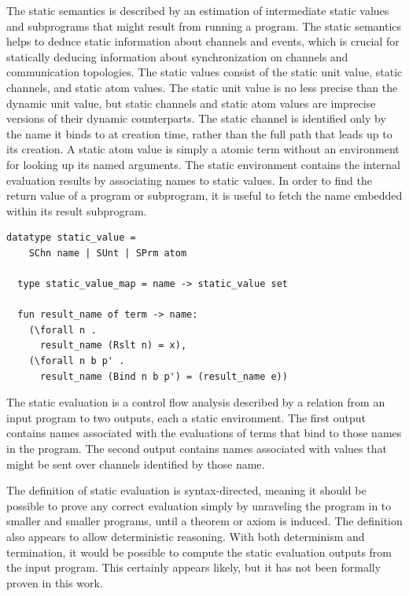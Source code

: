 \documentclass[10pt]{article}
\begin{document}
The static semantics is described by an estimation of
intermediate static values and subprograms
that might result from running a program.    
The static semantics helps to deduce static information about channels and events, which is
crucial for statically deducing information about synchronization on channels and
communication topologies.
The static values consist of the static unit value, static channels, and static atom
values. The static unit value is no less precise than the dynamic unit value, but
static channels and static atom values are imprecise versions of their dynamic
counterparts. The static channel is identified only by the name it binds to at creation time,
rather than the full path that leads up to its creation.  A static atom value is simply a
atomic term without an environment for looking up its named arguments. The static
environment contains the internal evaluation results by associating names to static values.
In order to find the return value of a program or subprogram, it is useful to fetch the name
embedded within its result subprogram.

\begin{lstlisting}[language=logic, mathescape]
  datatype static_value =
    SChn name | SUnt | SPrm atom 

  type static_value_map = name -> static_value set

  fun result_name of term -> name:
    (\forall n .
      result_name (Rslt n) = x),
    (\forall n b p' . 
      result_name (Bind n b p') = (result_name e))
  \end{lstlisting}


The static evaluation is a control flow analysis described by a relation from an input program
to two outputs, each a static environment. The first output contains names associated with the
evaluations of terms that bind to those names in the program. The second output contains
names associated with values that might be sent over channels identified by those name.

The definition of static evaluation is syntax-directed, meaning it should be possible to
prove any correct evaluation simply by unraveling the program in to smaller and smaller
programs, until a theorem or axiom is induced. The definition also appears to allow
deterministic reasoning. With both determinism and termination, it would be possible to compute
the static evaluation outputs from the input program. This certainly appears likely, but it has
not been formally proven in this work.
\end{document}
